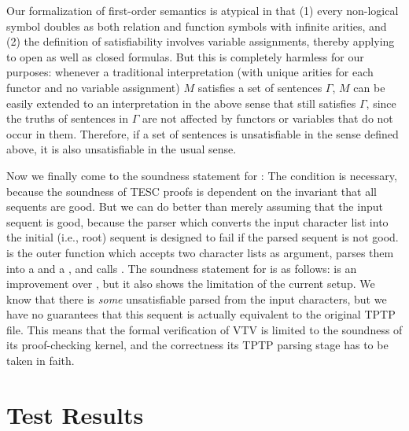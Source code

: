 \documentclass[12pt]{article}
\begin{document}
Our formalization of first-order semantics is atypical in that (1) every non-logical 
symbol doubles as both relation and function symbols with infinite arities, and 
(2) the definition of satisfiability involves variable assignments, thereby applying to
open as well as closed formulas. But this is completely harmless for our purposes:
whenever a traditional interpretation (with unique arities for each functor and no 
variable assignment) $M$ satisfies a set of sentences $\Gamma$, $M$ can be easily extended 
to an interpretation in the above sense that still satisfies $\Gamma$, since the 
truths of sentences in $\Gamma$ are not affected by functors or variables that do not 
occur in them. Therefore, if a set of sentences is unsatisfiable in the sense defined 
above, it is also unsatisfiable in the usual sense. 

Now we finally come to the soundness statement for :
The condition \AgdaSpace{} is necessary, because 
the soundness of TESC proofs is dependent on the invariant that all sequents are good. 
But we can do better than merely assuming that the input sequent is good,
because the parser which converts the input character list into the initial (i.e., root) 
sequent is designed to fail if the parsed sequent is not good. 
is the outer function which accepts two character lists as argument, parses them 
into a  and a , and calls .
The soundness statement for  is as follows:
 is an improvement over ,
but it also shows the limitation of the current setup. We know that there is 
\textit{some} unsatisfiable  parsed from the input characters, 
but we have no guarantees that this sequent is actually equivalent to the original
TPTP file. This means that the formal verification of VTV is limited to the soundness 
of its proof-checking kernel, and the correctness its TPTP parsing stage has to be 
taken in faith.



\section{Test Results} \label{sec:test-results}


\end{document}
